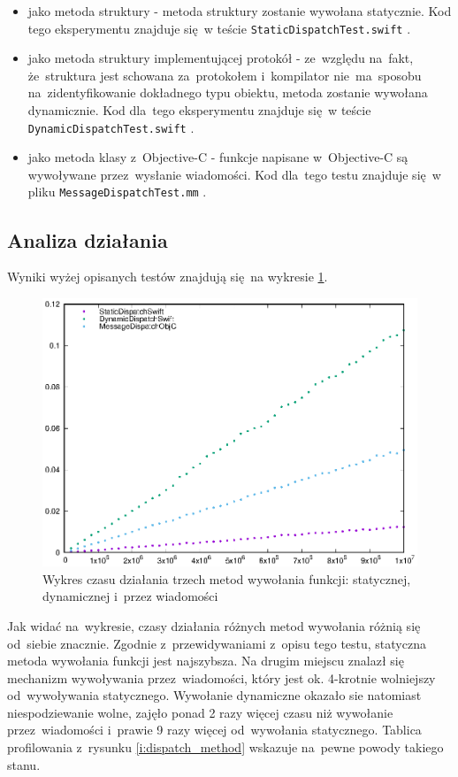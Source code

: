 \documentclass[mgr, shortabstract]{iithesis}
\newcommand{\swiftinline}[1]{
    \texttt{#1}
}
\begin{document}
\begin{itemize}
    \item jako metoda struktury - metoda struktury zostanie wywołana statycznie. Kod tego eksperymentu znajduje się w teście \swiftinline{StaticDispatchTest.swift}.
    \item jako metoda struktury implementującej protokół - ze~względu na~fakt, że~struktura jest schowana za~protokołem i~kompilator nie~ma~sposobu na~zidentyfikowanie dokładnego typu obiektu, metoda zostanie wywołana dynamicznie. Kod dla~tego eksperymentu znajduje się w teście \swiftinline{DynamicDispatchTest.swift}.
    \item jako metoda klasy z~Objective-C - funkcje napisane w~Objective-C są wywoływane przez~wysłanie wiadomości. Kod dla~tego testu znajduje się w pliku \swiftinline{MessageDispatchTest.mm}.
\end{itemize}

\subsection{Analiza działania}

Wyniki wyżej opisanych testów znajdują się na wykresie \ref{p:dispatch_method}.

\begin{figure}[h]
    \includegraphics{plots/Dispatch.eps}
    \caption{Wykres czasu działania trzech metod wywołania funkcji: statycznej, dynamicznej i~przez wiadomości}
    \label{p:dispatch_method}
\end{figure}

Jak widać na~wykresie, czasy działania różnych metod wywołania różnią się od~siebie znacznie. Zgodnie z~przewidywaniami z~opisu tego testu, statyczna metoda wywołania funkcji jest najszybsza. Na drugim miejscu znalazł się mechanizm wywoływania przez~wiadomości, który jest ok. 4-krotnie wolniejszy od~wywoływania statycznego. Wywołanie dynamiczne okazało sie natomiast niespodziewanie wolne, zajęło ponad 2 razy więcej czasu niż wywołanie przez~wiadomości i~prawie 9 razy więcej od~wywołania statycznego. Tablica profilowania z~rysunku \ref{i:dispatch_method} wskazuje na~pewne powody takiego stanu.
\end{document}
